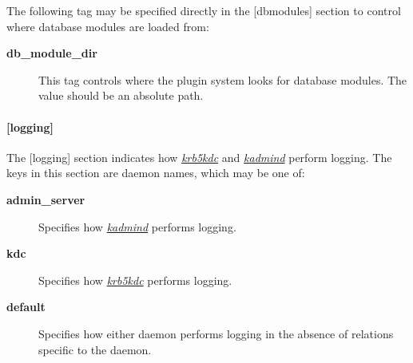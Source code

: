 \documentclass[letterpaper,10pt,english]{sphinxmanual}
\begin{document}
The following tag may be specified directly in the {[}dbmodules{]}
section to control where database modules are loaded from:
\begin{description}
\item[{\textbf{db\_module\_dir}}] \leavevmode
This tag controls where the plugin system looks for database
modules.  The value should be an absolute path.

\end{description}


\paragraph{{[}logging{]}}
\label{admin/conf_files/kdc_conf:id4}\label{admin/conf_files/kdc_conf:logging}
The {[}logging{]} section indicates how {\hyperref[admin/admin_commands/krb5kdc:krb5kdc-8]{\emph{krb5kdc}}} and
{\hyperref[admin/admin_commands/kadmind:kadmind-8]{\emph{kadmind}}} perform logging.  The keys in this section are
daemon names, which may be one of:
\begin{description}
\item[{\textbf{admin\_server}}] \leavevmode
Specifies how {\hyperref[admin/admin_commands/kadmind:kadmind-8]{\emph{kadmind}}} performs logging.

\item[{\textbf{kdc}}] \leavevmode
Specifies how {\hyperref[admin/admin_commands/krb5kdc:krb5kdc-8]{\emph{krb5kdc}}} performs logging.

\item[{\textbf{default}}] \leavevmode
Specifies how either daemon performs logging in the absence of
relations specific to the daemon.

\end{description}
\end{document}
